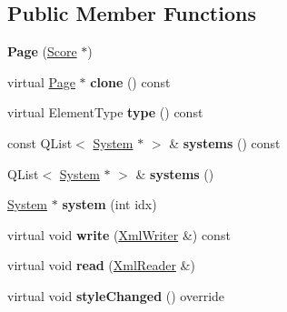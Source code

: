 \subsection*{Public Member Functions}
\begin{DoxyCompactItemize}
\item 
\mbox{\label{class_ms_1_1_page_af7e4f71ea8d05f12145054271436514c}} 
{\bfseries Page} (\hyperlink{class_ms_1_1_score}{Score} $\ast$)
\item 
\mbox{\label{class_ms_1_1_page_a3ad6bdad624aeabcffb0f2c4315ebaaf}} 
virtual \hyperlink{class_ms_1_1_page}{Page} $\ast$ {\bfseries clone} () const
\item 
\mbox{\label{class_ms_1_1_page_a68407bbde975e4499e01b93a52466ee2}} 
virtual Element\+Type {\bfseries type} () const
\item 
\mbox{\label{class_ms_1_1_page_a4406043135c1ea0028f010710ebe9774}} 
const Q\+List$<$ \hyperlink{class_ms_1_1_system}{System} $\ast$ $>$ \& {\bfseries systems} () const
\item 
\mbox{\label{class_ms_1_1_page_a28163bf1b03901867f9c7c6f3f61b130}} 
Q\+List$<$ \hyperlink{class_ms_1_1_system}{System} $\ast$ $>$ \& {\bfseries systems} ()
\item 
\mbox{\label{class_ms_1_1_page_ab917dcde6386b61a6b853955b849f50f}} 
\hyperlink{class_ms_1_1_system}{System} $\ast$ {\bfseries system} (int idx)
\item 
\mbox{\label{class_ms_1_1_page_a84ce0386fcac757e1fe3e6c881792ca3}} 
virtual void {\bfseries write} (\hyperlink{class_ms_1_1_xml_writer}{Xml\+Writer} \&) const
\item 
\mbox{\label{class_ms_1_1_page_a2f4e4e10ac560d99c37a6abf76789852}} 
virtual void {\bfseries read} (\hyperlink{class_ms_1_1_xml_reader}{Xml\+Reader} \&)
\item 
\mbox{\label{class_ms_1_1_page_a923bf1cc584724ff95d5c5ab8c65ebff}} 
virtual void {\bfseries style\+Changed} () override
\item 

\end{DoxyCompactItemize}
